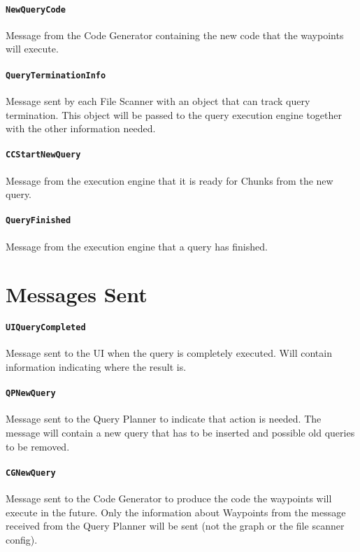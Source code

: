 \documentclass[11pt]{article}
\begin{document}
\paragraph*{\texttt{NewQueryCode}} Message from the Code Generator
containing the new code that the waypoints will execute.

\paragraph*{\texttt{QueryTerminationInfo}} Message sent by each File
Scanner with an object that can track query termination. This object
will be passed to the query execution engine together with the other
information needed.

\paragraph*{\texttt{CCStartNewQuery}} Message from the execution engine
that it is ready for Chunks from the new query.

\paragraph*{\texttt{QueryFinished}} Message from the execution engine
that a query has finished.

\section{Messages Sent}

\paragraph*{\texttt{UIQueryCompleted}} Message sent to the UI when the
query is completely executed. Will contain information indicating
where the result is.

\paragraph*{\texttt{QPNewQuery}} Message sent to the Query Planner to
indicate that action is needed. The message will contain a new query
that has to be inserted and possible old queries to be removed.

\paragraph*{\texttt{CGNewQuery}} Message sent to the Code Generator to
produce the code the waypoints will execute in the future. Only the
information about Waypoints from the message received from the Query
Planner will be sent (not the graph or the file scanner config).
\end{document}
